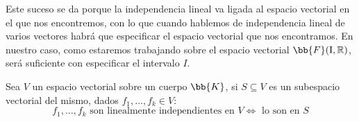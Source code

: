 Este suceso se da porque la independencia lineal va ligada al espacio vectorial en el que nos encontremos, con lo que cuando hablemos de independencia lineal de varios vectores habrá que especificar el espacio vectorial que nos encontramos. En nuestro caso, como estaremos trabajando sobre el espacio vectorial $\bb{F}(\text{I},\mathbb{R})$, será suficiente con especificar el intervalo $I$.

\begin{prop}
    Sea $V$ un espacio vectorial sobre un cuerpo $\bb{K}$, si $S\subseteq V$ es un subespacio vectorial del mismo, dados $f_1,\ldots,f_k\in V$:
    \begin{equation*}
        f_1,\ldots,f_k \text{\ son linealmente independientes en\ } V \Longleftrightarrow \text{\ lo son en\ } S
    \end{equation*}
\end{prop}

